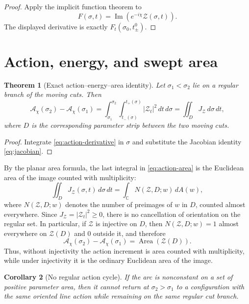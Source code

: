 \documentclass[11pt]{amsart}
\numberwithin{equation}{section}
\newtheorem{theorem}{Theorem}[section]
\newtheorem{corollary}[theorem]{Corollary}
\newcommand{\C}{\mathbb C}
\newcommand{\Zcal}{\mathcal Z}
\newcommand{\Acal}{\mathscr A}
\newcommand{\dd}{\,d}
\begin{document}
\begin{proof}
Apply the implicit function theorem to
\[
F(\sigma,t)=\operatorname{Im}(e^{-i\chi}\Zcal(\sigma,t)).
\]
The displayed derivative is exactly $F_t(\sigma_0,t_\pm^0)$.
\end{proof}

\section{Action, energy, and swept area}

\begin{theorem}[Exact action--energy--area identity]
Let $\sigma_1<\sigma_2$ lie on a regular branch of the moving cuts.  Then
\begin{equation}
\boxed{
\Acal_\chi(\sigma_2)-\Acal_\chi(\sigma_1)
=\int_{\sigma_1}^{\sigma_2}\int_{t_-(\sigma)}^{t_+(\sigma)}
|\Zcal_t|^2\dd t\dd\sigma
=\iint_D J_{\Zcal}\dd\sigma\dd t,
}
\label{eq:action-area}
\end{equation}
where $D$ is the corresponding parameter strip between the two moving cuts.
\end{theorem}

\begin{proof}
Integrate \eqref{eq:action-derivative} in $\sigma$ and substitute the Jacobian identity \eqref{eq:jacobian}.
\end{proof}

By the planar area formula, the last integral in \eqref{eq:action-area} is the Euclidean area of the image counted with multiplicity:
\begin{equation}
\boxed{
\iint_D J_{\Zcal}(\sigma,t)\dd\sigma\dd t
=
\int_{\C} N(\Zcal,D;w)\dd A(w),
}
\label{eq:area-multiplicity}
\end{equation}
where $N(\Zcal,D;w)$ denotes the number of preimages of $w$ in $D$, counted almost everywhere.  Since $J_{\Zcal}=|\Zcal_t|^2\ge0$, there is no cancellation of orientation on the regular set.  In particular, if $\Zcal$ is injective on $D$, then $N(\Zcal,D;w)=1$ almost everywhere on $\Zcal(D)$ and $0$ outside it, and therefore
\begin{equation}
\boxed{
\Acal_\chi(\sigma_2)-\Acal_\chi(\sigma_1)
=\operatorname{Area}(\Zcal(D)).
}
\label{eq:ordinary-area}
\end{equation}
Thus, without injectivity the action increment is area counted with multiplicity, while under injectivity it is the ordinary Euclidean area of the image.

\begin{corollary}[No regular action cycle]
If the arc is nonconstant on a set of positive parameter area, then it cannot return at $\sigma_2>\sigma_1$ to a configuration with the same oriented line action while remaining on the same regular cut branch.
\end{corollary}
\end{document}
